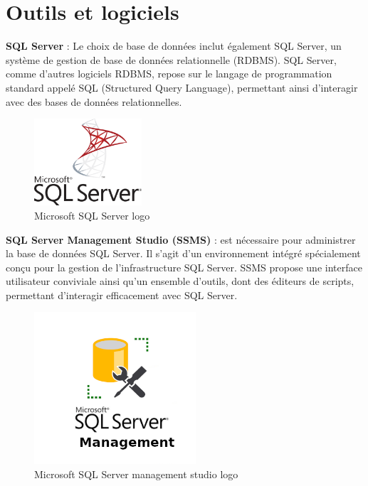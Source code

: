 \section{Outils et logiciels}


\textbf{SQL Server} : Le choix de base de données inclut également SQL Server, un système de gestion de base de données relationnelle (RDBMS). SQL Server, comme d'autres logiciels RDBMS, repose sur le langage de programmation standard appelé SQL (Structured Query Language), permettant ainsi d'interagir avec des bases de données relationnelles.
\\
\begin{figure}[H] 
    \centering
    \includegraphics[width=4cm]{Figures/sqlserver.png}
        \caption{Microsoft SQL Server logo}
\end{figure}



\textbf{SQL Server Management Studio (SSMS)} : est nécessaire pour administrer la base de données SQL Server. Il s'agit d'un environnement intégré spécialement conçu pour la gestion de l'infrastructure SQL Server. SSMS propose une interface utilisateur conviviale ainsi qu'un ensemble d'outils, dont des éditeurs de scripts, permettant d'interagir efficacement avec SQL Server.
\\
\begin{figure}[H] 
    \centering
    \includegraphics[width=6cm]{Figures/sqlmanagementstudio.png}
        \caption{Microsoft SQL Server management studio logo}
\end{figure}



